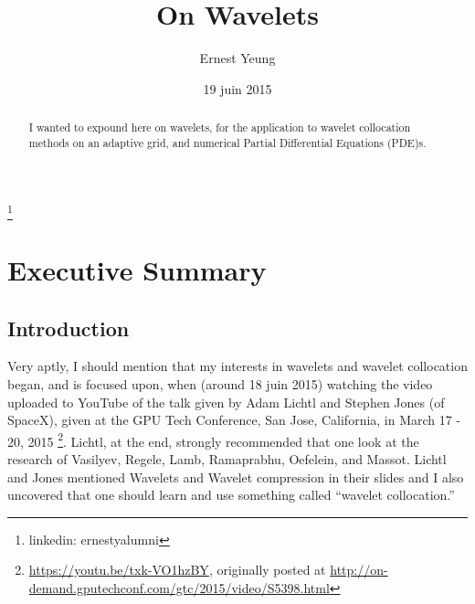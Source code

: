 \documentclass[twoside]{amsart}
\theoremstyle{plain}
\theoremstyle{definition}
\theoremstyle{remark}
\numberwithin{equation}{section}
\begin{document}
\title[Wavelets]{On Wavelets}
\author{Ernest Yeung}
\address{}
\thanks{linkedin: ernestyalumni}






\date{19 juin 2015}
\begin{abstract}
I wanted to expound here  on wavelets, for the application to wavelet collocation methods on an adaptive grid, and numerical Partial Differential Equations (PDE)s.    
\end{abstract}

\maketitle




\tableofcontents

\section{Executive Summary}

\subsection{Introduction}

Very aptly, I should mention that my interests in wavelets and wavelet collocation began, and is focused upon, when (around 18 juin 2015) watching the video uploaded to YouTube of the talk given by Adam Lichtl and Stephen Jones (of SpaceX), given at the GPU Tech Conference, San Jose, California, in March 17 - 20, 2015 \footnote{\url{https://youtu.be/txk-VO1hzBY}, originally posted at \url{http://on-demand.gputechconf.com/gtc/2015/video/S5398.html}}.  Lichtl, at the end, strongly recommended that one look at the research of Vasilyev, Regele, Lamb, Ramaprabhu, Oefelein, and Massot.  Lichtl and Jones mentioned Wavelets and Wavelet compression in their slides and I also uncovered that one should learn and use something called ``wavelet collocation.''  
\end{document}
